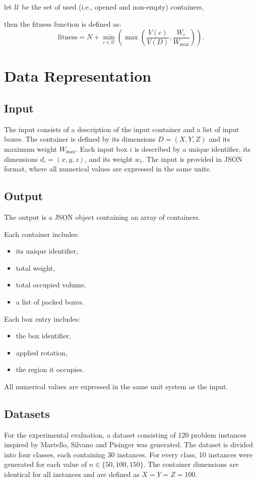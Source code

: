 let \( \mathcal{U} \) be the set of used (i.e., opened and non-empty) containers,

then the fitness function is defined as:
\[
\text{fitness} = N + \min_{c \in \mathcal{U}} \left( \max \left( \frac{V(c)}{V(D)}, \frac{W_c}{W_\text{max}} \right) \right).
\]


\section{Data Representation}

\subsection{Input}

The input consists of a description of the input container and a list of input boxes. 
The container is defined by its dimensions \( D = (X, Y, Z) \) and its maximum weight \( W_\text{max} \). 
Each input box $i$ is described by a unique identifier, its dimensions \( d_i = (x, y, z) \), and its weight \( w_i \).
The input is provided in JSON format, where all numerical values are expressed in the same units.

\subsection{Output}

The output is a JSON object containing an array of containers.

Each container includes:
\begin{itemize}
    \item its unique identifier,
    \item total weight,
    \item total occupied volume,
    \item a list of packed boxes.
\end{itemize}

Each box entry includes:
\begin{itemize}
    \item the box identifier,
    \item applied rotation,
    \item the region it occupies.
\end{itemize}

All numerical values are expressed in the same unit system as the input.

\subsection{Datasets}
For the experimental evaluation, a dataset consisting of 120 problem instances inspired by Martello, Silvano and Pisinger \cite{martello2000} was generated. 
The dataset is divided into four classes, each containing 30 instances. 
For every class, 10 instances were generated for each value of $n \in \{50, 100, 150\}$. The container dimensions are identical for all instances and are defined as $X = Y = Z = 100$.

